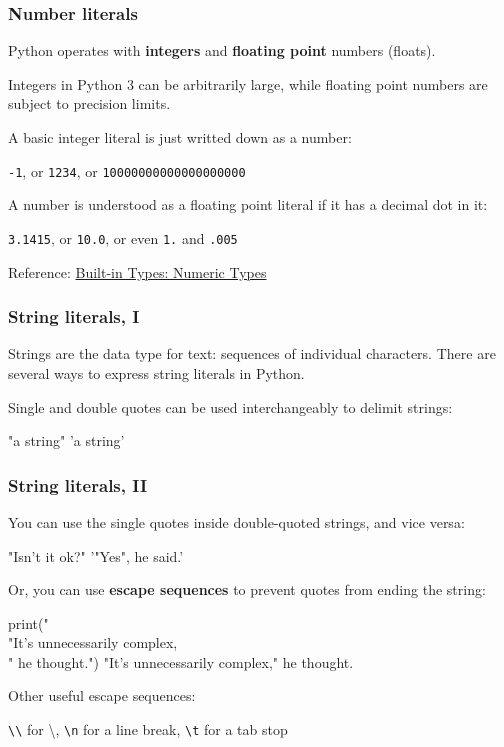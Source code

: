 \documentclass[english,serif,mathserif,xcolor=pdftex,dvipsnames,table]{beamer}
\begin{document}
\begin{frame}[fragile]
  \frametitle{Number literals}

  Python operates with \textbf{integers} and \textbf{floating point} numbers (floats).

  \+
  Integers in Python 3 can be arbitrarily large, while floating point numbers
  are subject to precision limits.
  
  \+
  A basic integer literal is just writted down as a number:
  
  \texttt{-1}, or \texttt{1234}, or \texttt{10000000000000000000}

  \+
  A number is understood as a floating point literal if it has a decimal dot in it:

  \texttt{3.1415}, or \texttt{10.0}, or even \texttt{1.} and \texttt{.005}

  \+\scriptsize
  Reference:
  \href{https://docs.python.org/3/library/stdtypes.html#numeric-types-int-float-complex}{Built-in Types: Numeric Types}
\end{frame}

\begin{frame}[fragile]
  \frametitle{String literals, I}
  Strings are the data type for text: sequences of individual characters.
  There are several ways to express string literals in Python.

  \+
  Single and double quotes can be used interchangeably to delimit strings:
\begin{semiverbatim}
"a string"
'a string'
\end{semiverbatim}
\end{frame}

\begin{frame}[fragile]
  \frametitle{String literals, II}

  You can use the single quotes inside double-quoted strings, and vice versa:
\begin{semiverbatim}
"Isn't it ok?"
'"Yes", he said.'
\end{semiverbatim}

  Or, you can use \textbf{escape sequences} to prevent quotes from ending the string:
  
  {
  \smaller
\begin{semiverbatim}
\In print("\\"It's unnecessarily complex,\\" he thought.")
\Out "It's unnecessarily complex," he thought.
\end{semiverbatim}
  }

Other useful escape sequences:

  \texttt{\textbackslash\textbackslash} for \textbackslash,
  \texttt{{\textbackslash}n} for a line break, \texttt{{\textbackslash}t} for a tab stop

\end{frame}
\end{document}
